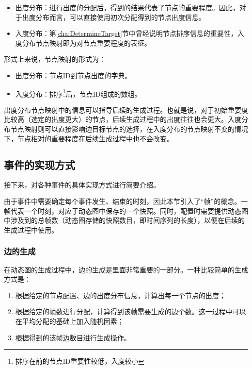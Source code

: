 \begin{itemize}
  \item 出度分布：进行出度的分配后，得到的结果代表了节点的重要程度。因此，对于出度分布而言，可以直接使用初次分配得到的节点出度信息。
  \item 入度分布：第\ref{cha:DetermineTarget}节中曾经说明节点排序信息的重要性，入度分布节点映射即为对节点重要程度的表征。
\end{itemize}

\vspace{0.2cm}

形式上来说，节点映射的形式为：

\begin{itemize}
  \item 出度分布：节点ID到节点出度的字典。
  \item 入度分布：排序\footnote{排序在前的节点ID重要性较低，入度较小}后，节点ID组成的数组。
\end{itemize}

\vspace{0.2cm}

出度分布节点映射中的信息可以指导后续的生成过程。也就是说，对于初始重要度比较高（选定的出度更大）的节点，后续生成过程中的出度往往也会更大。入度分布节点映射则可以直接影响边目标节点的选择，在入度分布的节点映射不变的情况下，节点相对的重要程度在后续生成过程中也不会改变。

\subsection{事件的实现方式}

接下来，对各种事件的具体实现方式进行简要介绍。

由于事件中需要确定每个事件发生、结束的时刻，因此本节引入了“帧”的概念。一帧代表一个时刻，对应于动态图中保存的一个快照。同时，配置时需要提供动态图中涉及到的总帧数（动态图存储的快照数目，即时间序列的长度），以便在后续的生成过程中使用。

\subsubsection{边的生成}

在动态图的生成过程中，边的生成是里面非常重要的一部分。一种比较简单的生成方式是：

\begin{enumerate}
  \item 根据给定的节点配置、边的出度分布信息，计算出每一个节点的出度；
  \item 根据给定的帧数进行分配，计算得到该帧需要生成的边个数。这一过程中可以在平均分配的基础上加入随机因素；
  \item 根据得到的该帧边数目进行生成操作。
\end{enumerate}

